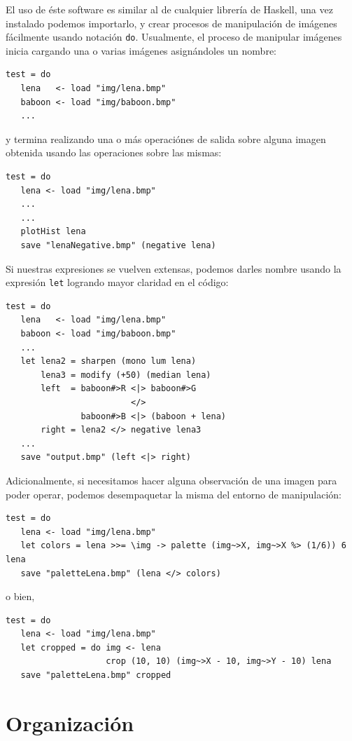 \documentclass[a4paper, 11pt]{article} %
\begin{document}
	El uso de éste software es similar al de cualquier librería de Haskell, una vez instalado podemos importarlo, y crear procesos de manipulación de imágenes fácilmente usando notación \texttt{do}.
	Usualmente, el proceso de manipular imágenes inicia cargando una o varias imágenes asignándoles un nombre:
\begin{lstlisting}
test = do
   lena   <- load "img/lena.bmp"
   baboon <- load "img/baboon.bmp"
   ...
\end{lstlisting}

\noindent y termina realizando una o más operaciónes de salida sobre alguna imagen obtenida usando las operaciones sobre las mismas:
\begin{lstlisting}
test = do
   lena <- load "img/lena.bmp"
   ...
   ...
   plotHist lena
   save "lenaNegative.bmp" (negative lena)
\end{lstlisting}

\noindent Si nuestras expresiones se vuelven extensas, podemos darles nombre usando la expresión \texttt{let} logrando mayor claridad en el código:
\begin{lstlisting}
test = do
   lena   <- load "img/lena.bmp"
   baboon <- load "img/baboon.bmp"
   ...
   let lena2 = sharpen (mono lum lena)
       lena3 = modify (+50) (median lena) 
       left  = baboon#>R <|> baboon#>G
                         </>
               baboon#>B <|> (baboon + lena)
       right = lena2 </> negative lena3
   ...	   		   
   save "output.bmp" (left <|> right)
\end{lstlisting}

\noindent Adicionalmente, si necesitamos hacer alguna observación de una imagen para poder operar, podemos desempaquetar la misma del entorno de manipulación:
\begin{lstlisting}
test = do
   lena <- load "img/lena.bmp"
   let colors = lena >>= \img -> palette (img~>X, img~>X %> (1/6)) 6 lena
   save "paletteLena.bmp" (lena </> colors)
\end{lstlisting}
o bien,
\begin{lstlisting}
test = do
   lena <- load "img/lena.bmp"
   let cropped = do img <- lena  
                    crop (10, 10) (img~>X - 10, img~>Y - 10) lena
   save "paletteLena.bmp" cropped
\end{lstlisting}


\section*{Organización}
\end{document}
